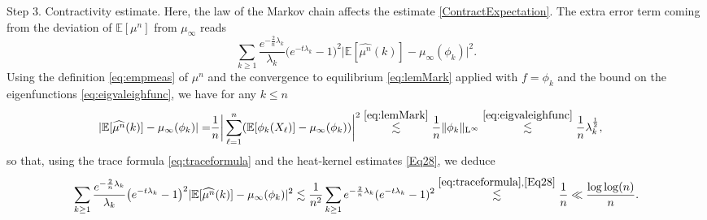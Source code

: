 \documentclass[11pt,a4paper,oneside]{amsart}
\numberwithin{equation}{section}
\newcommand{\LL}{\mathrm{L}}
\newcommand{\nc}[1]{\textcolor{red}{[N: #1]}}
\begin{document}
%
{\sc Step 3. Contractivity estimate. }Here, the law of the Markov chain affects the estimate \eqref{ContractExpectation}. The extra error term coming from the deviation of $\mathbb{E}[\mu^n]$ from $\mu_\infty$ reads
%
$$\sum_{k\geq 1} \frac{e^{-\frac{2}{n}\lambda_k}}{\lambda_k}\big(e^{-t\lambda_k}-1\big)^2\vert\mathbb{E}[\widehat{\mu^n}(k)]-\mu_\infty(\phi_k)\vert^2.$$
%
Using the definition \eqref{eq:empmeas} of $\mu^n$ and the convergence to equilibrium \eqref{eq:lemMark} applied with $f=\phi_k$ and the bound on the eigenfunctions \eqref{eq:eigvaleighfunc}, we have for any $k\leq n$
%
\begin{align*}
%
\vert\mathbb{E}[\widehat{\mu^n}(k)]-\mu_\infty(\phi_k)\vert=&\frac{1}{n}\bigg\vert\sum_{\ell=1}^n(\mathbb{E}[\phi_k(X_{\ell})]-\mu_\infty(\phi_k))\bigg\vert^2\stackrel{\eqref{eq:lemMark}}{\lesssim} \frac{1}{n}\|\phi_k\|_{\LL^{\infty}}\stackrel{\eqref{eq:eigvaleighfunc}}{\lesssim}\frac{1}{n}\lambda^{\frac{1}{2}}_k,
%
\end{align*}
%
so that, using the trace formula \eqref{eq:traceformula} and the heat-kernel estimates \eqref{Eq28}, we deduce 
%
$$\sum_{k\geq 1} \frac{e^{-\frac{2}{n}\lambda_k}}{\lambda_k}\big(e^{-t\lambda_k}-1\big)^2\vert\mathbb{E}[\widehat{\mu^n}(k)]-\mu_\infty(\phi_k)\vert^2\lesssim \frac{1}{n^2}\sum_{k\geq 1}e^{-\frac{2}{n}\lambda_k}(e^{-t\lambda_k}-1)^2\stackrel{\eqref{eq:traceformula},\eqref{Eq28}}{\lesssim} \frac{1}{n} \ll \frac{\log\log(n)}{n}.$$
%
\end{document}
